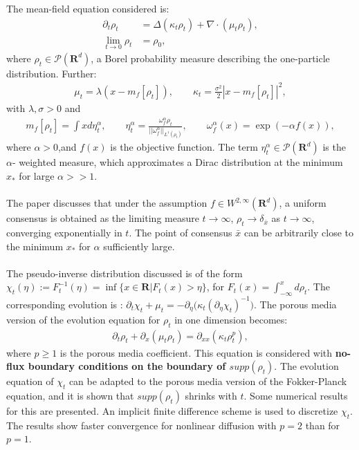 \documentclass[11pt, a4paper]{article}
\theoremstyle{definition}
\begin{document}
The mean-field equation considered is:
\begin{align*}
\partial_t\rho_t &= \Delta( \kappa_t \rho_t) + \nabla \cdot (\mu_t \rho_t),\\
\lim_{t \to 0}\rho_t &= \rho_0,
\end{align*}
where $\rho_t \in \mathcal{P}(\mathbf{R}^d)$, a Borel probability measure describing the one-particle distribution. Further:
\begin{align*}
\mu_t = \lambda(x-m_f[\rho_t]), \qquad
\kappa_t = \frac{\sigma^2}{2}|x-m_f[\rho_t]|^2,
\end{align*}
with $\lambda, \sigma>0$
and 
\begin{align*}
m_f[\rho_t] = \int x d \eta_t^\alpha, \qquad
\eta_t^\alpha = \frac{\omega_f^\alpha \rho_t}{||\omega_f^\alpha||_{L^1(\rho_t)}},
\qquad \omega_f^\alpha(x) = \exp(-\alpha f(x)),
\end{align*}
where $\alpha>0$,and $f(x)$ is the objective function. The term $\eta_t^\alpha \in \mathcal{P}(\mathbf{R}^d)$ is the $\alpha$- weighted measure, which approximates a Dirac distribution at the minimum $x_*$ for large $\alpha >>1$.
\\
\\
The paper discusses that under the assumption $f \in W^{2,\infty}(\mathbf{R}^d)$, a uniform consensus is obtained as the limiting measure $t \to \infty$, $\rho_t \to \delta_{\bar{x}}$ as $t \to \infty$, converging exponentially in $t$. 
The point of consensus $\bar{x}$ can be arbitrarily close to the minimum $x_*$ for $\alpha$ sufficiently large.  
\\
\\
The pseudo-inverse distribution discussed is of the form $\chi_t(\eta) := F^{-1}_t(\eta)= \inf \{x \in \mathbf{R}| F_t(x)>\eta\}$, for $F_t(x) = \int_{-\infty}^x d \rho_t$. The corresponding evolution is : $\partial_t \chi_t + \mu_t = - \partial_\eta \bigg(\kappa_t (\partial_\eta \chi_t)^{-1}\bigg)$.
The porous media version of the evolution equation for $\rho_t$ in one dimension becomes:
\begin{align*}
\partial_t \rho_t + \partial_x (\mu_t \rho_t) = \partial_{xx}(\kappa_t \rho_t^p),
\end{align*}
where $p \geq 1$ is the porous media coefficient. This equation is considered with \textbf{no-flux boundary conditions on the boundary of $supp (\rho_t)$}. The evolution equation of $\chi_t$ can be adapted to the porous media version of the Fokker-Planck equation, and it is shown that $supp (\rho_t)$ shrinks with $t$.
Some numerical results for this are presented. An implicit finite difference scheme is used to discretize $\chi_t$. The results show faster convergence for nonlinear diffusion with $p=2$ than for $p=1$. 
\end{document}
